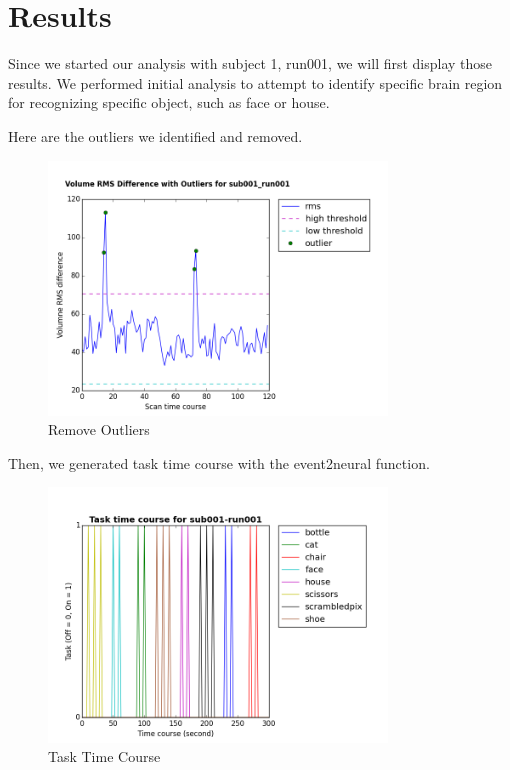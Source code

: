 \documentclass[11pt,twocolumn]{article}
\begin{document}
\section{Results}

Since we started our analysis with subject 1, run001, we will first display those
results. We performed initial analysis to attempt to identify specific brain region 
for recognizing specific object, such as face or house. 

Here are the outliers we identified and removed. \\
\begin{figure}[h!]
\centering
\includegraphics[width=90mm]{Volume_RMS_Difference_Outliers_sub001_run001.png}
\caption{Remove Outliers}
\end{figure}

Then, we generated task time course with the event2neural function.
\begin{figure}[h!]
\centering
\includegraphics[width=90mm]{Task_time_course_sub001_run001.png}
\caption{Task Time Course}
\end{figure}

\pagebreak 
\end{document}
